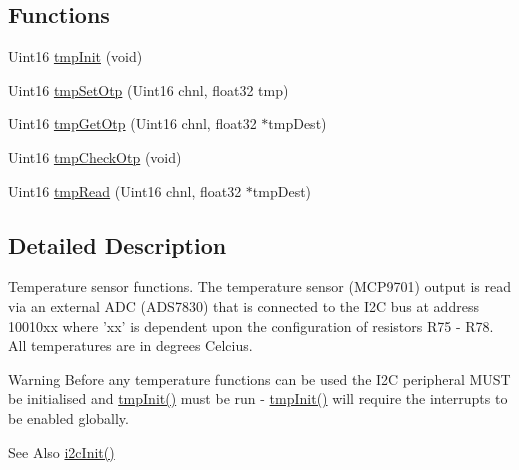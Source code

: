 \subsection*{Functions}
\begin{DoxyCompactItemize}
\item 
Uint16 \hyperlink{a00041_a4f10186d5fb8a3069cc30c9d0c7e716f}{tmp\-Init} (void)
\item 
Uint16 \hyperlink{a00041_a10e85d2f2d7cce42822ea65e69601dfa}{tmp\-Set\-Otp} (Uint16 chnl, float32 tmp)
\item 
Uint16 \hyperlink{a00041_a9aedec904a421fed1823a16846b7841d}{tmp\-Get\-Otp} (Uint16 chnl, float32 $\ast$tmp\-Dest)
\item 
Uint16 \hyperlink{a00041_adf839085f18308f90ee198a96bbac364}{tmp\-Check\-Otp} (void)
\item 
Uint16 \hyperlink{a00041_a3f542f4bc433dfd2c1073a5e8308f99f}{tmp\-Read} (Uint16 chnl, float32 $\ast$tmp\-Dest)
\end{DoxyCompactItemize}


\subsection{Detailed Description}
Temperature sensor functions. The temperature sensor (M\-C\-P9701) output is read via an external A\-D\-C (A\-D\-S7830) that is connected to the I2\-C bus at address 10010xx where 'xx' is dependent upon the configuration of resistors R75 -\/ R78. All temperatures are in degrees Celcius.

\begin{DoxyWarning}{Warning}
Before any temperature functions can be used the I2\-C peripheral M\-U\-S\-T be initialised and \hyperlink{a00041_a4f10186d5fb8a3069cc30c9d0c7e716f}{tmp\-Init()} must be run -\/ \hyperlink{a00041_a4f10186d5fb8a3069cc30c9d0c7e716f}{tmp\-Init()} will require the interrupts to be enabled globally.
\end{DoxyWarning}
\begin{DoxySeeAlso}{See Also}
\hyperlink{a00018_a1e0a81a1ad1fd7710ca189236e3e5476}{i2c\-Init()} 
\end{DoxySeeAlso}



